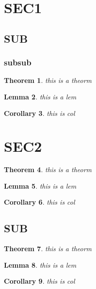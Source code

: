 \documentclass[12pt]{article}
\newtheorem{thm}{Theorem}[section]
\newtheorem{lem}[thm]{Lemma}
\newtheorem{corollary}[thm]{Corollary}
\begin{document}
\section{SEC1}

\subsection{SUB}

\subsubsection{subsub}

\begin{thm}
this is a theorm
\end{thm}

\begin{lem}
this is a lem
\end{lem}

\begin{corollary}
    this is col
\end{corollary}

\section{SEC2}

\begin{thm}
this is a theorm
\end{thm}

\begin{lem}
this is a lem
\end{lem}

\begin{corollary}
    this is col
\end{corollary}

\subsection{SUB}


\begin{thm}
this is a theorm
\end{thm}

\begin{lem}
this is a lem
\end{lem}

\begin{corollary}
    this is col
\end{corollary}
\end{document}
